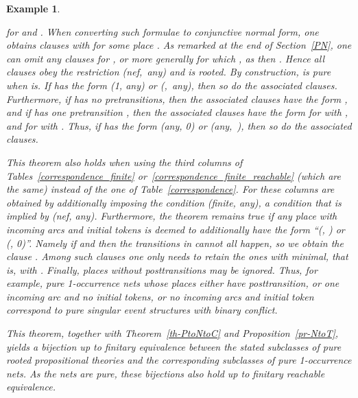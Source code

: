\documentclass[twocolumn]{article}
\makeatletter
\def\section{\@startsection {section}{1}{0pt}{-3.25ex plus -1ex minus 
   -.2ex}{1.5ex plus .2ex}{\large\bf}}
\newtheorem{exam}{Example}
\newenvironment{example}[1]{\begin{exam} \rm \label{ex-#1} }{\end{exam}}
\newenvironment{proof}{\begin{trivlist} \item[\hspace{\labelsep}\bf
Proof:]}{\hfill \end{trivlist}}
\newcommand{\thm}[1]{Theorem~\ref{th-#1}}
\newcommand{\pr}[1]{Proposition~\ref{pr-#1}}
\makeatother
\begin{document}
\begin{example}{causality}
\begin{proof}
\begin{proof}
for  and . When converting such
formulae to conjunctive normal form, one obtains clauses 
with  for some place . 
As remarked at the end of Section~\ref*{PN},
one can omit any clauses for , or more generally for
which ,
as then .
Hence all clauses obey the restriction
\mbox{(nef, any)} and  is rooted. By construction,  is
pure when  is.  If  has the form (1, any) or \mbox{(, any)}, then so do the associated clauses.  Furthermore, if
 has no pretransitions, then the associated clauses
have the form , and if  has one pretransition
, then the associated clauses have the form 
for  with 
, 
and  for  with
. Thus, if  has the form
(any, 0) or \mbox{(any, )}, then so do the associated clauses.
\end{proof}
This theorem also holds when using the third columns of
Tables~\ref{correspondence_finite} or~\ref{correspondence_finite_reachable}
(which are the same) instead of the one of Table~\ref{correspondence}.
For these columns are obtained by additionally imposing the condition
(finite, any), a condition that is implied by (nef, any). Furthermore,
the theorem remains true if any place  with  incoming arcs and 
initial tokens is deemed to additionally have the form
``(, ) or (, 0)''.
Namely if  and  then the
transitions in  cannot all happen, so we obtain the clause . Among such clauses one only needs to retain the
ones with  minimal, that is, with .
Finally, places without posttransitions may be ignored.\linebreak
Thus, for example, pure 1-occurrence nets whose places either have
 posttransition, or one incoming arc and no initial
tokens, or no incoming arcs and  initial token correspond to
pure singular event structures with binary conflict.

This theorem, together with \thm{PtoNtoC} and \pr{NtoT}, yields a
bijection up to finitary equivalence between the stated subclasses of
pure rooted propositional theories and the corresponding subclasses of
pure 1-occurrence nets. As the nets are pure, these bijections
also hold up to finitary reachable equivalence.



\section{Related Work}\label{related work}


\end{proof}
\end{example}
\end{document}
